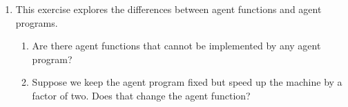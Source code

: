 \documentclass[11pt]{article}
\newcommand{\question}[1]{#1}
\newcommand{\answer}[1]{}
\begin{document}
\begin{enumerate}
\begin{enumerate}
\item
\question{This exercise explores the differences between agent functions and agent programs.
\begin{enumerate}
\item Are there agent functions that cannot be implemented by any agent program?
\item Suppose we keep the agent program fixed but speed up the machine by a factor of two.
Does that change the agent function?
\end{enumerate}
}
\answer{
\begin{enumerate}
\item Yes; the agent function might specify that the agent print true when the percept is a
Turing machine program that halts, and false otherwise. (Note: in dynamic environments,
for machines of less than infinite speed, the rational agent function may not be
implementable; e.g., the agent function that always plays a winning move, if any, in a
game of chess.)
\item It depends on the program and the environment. If the environment is dynamic, speeding
up the machine may mean choosing different (perhaps better) actions and/or acting
sooner. If the environment is static and the program pays no attention to the passage of
elapsed time, the agent function is unchanged.
\end{enumerate}
}


\end{enumerate}
\end{enumerate}
\end{document}
